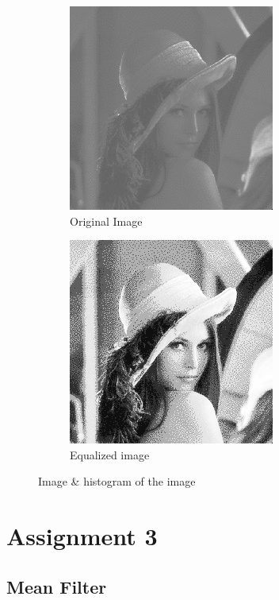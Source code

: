 \documentclass[a4paper,16pt]{article}
\begin{document}
	\begin{figure}[h!]
		\begin{subfigure}[h]{0.6\linewidth}
			\includegraphics[scale=1]{Lenna}
			\caption{Original Image}
		\end{subfigure}
		\begin{subfigure}[h]{0.6\linewidth}
			\includegraphics[scale=0.76]{myGray}
			\caption{Equalized image}
		\end{subfigure}%
		\caption{Image \& histogram of the image}
	\end{figure}
	\newpage
	\section{Assignment 3}
	\vspace{0.2in}
	\subsection{Mean Filter}
		
\end{document}
